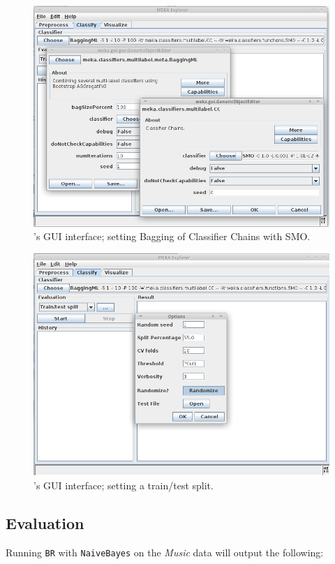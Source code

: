 \documentclass[11pt]{article}
\begin{document}
\begin{figure}
	\centering
	\includegraphics[height=0.60\textwidth]{GUI02.png}
	\caption{\label{screen:eval} 's GUI interface; setting Bagging of Classifier Chains with SMO.}
\end{figure}


\begin{figure}
	\centering
	\includegraphics[height=0.60\textwidth]{GUI03.png}
	\caption{\label{screen:split} 's GUI interface; setting a train/test split.}
\end{figure}

\subsection{\label{sec:evaluation}Evaluation}

Running \texttt{BR} {\green with \texttt{NaiveBayes}} on the \textit{Music} data will output the following:

%
\begin{center}
%

\end{center}
\end{document}
